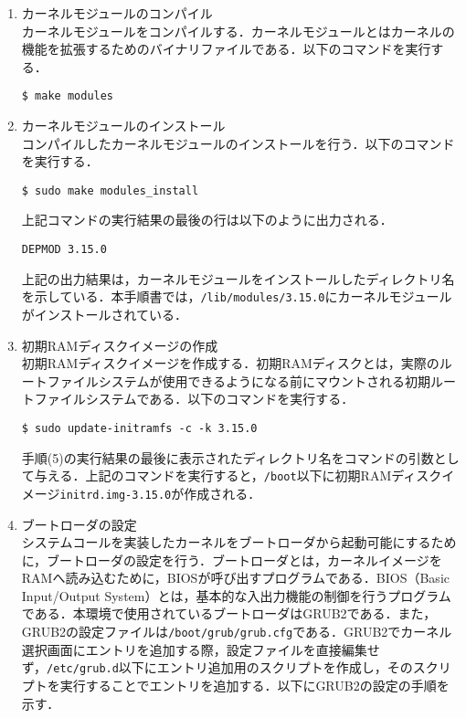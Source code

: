 \documentclass[12pt]{jsarticle}
\begin{document}
\begin{enumerate}
\item カーネルモジュールのコンパイル \\
  カーネルモジュールをコンパイルする．カーネルモジュールとはカーネルの機能を拡張するためのバイナリファイルである．以下のコマンドを実行する．

\begin{verbatim}
$ make modules
\end{verbatim}
  
\item カーネルモジュールのインストール \\
  コンパイルしたカーネルモジュールのインストールを行う．以下のコマンドを実行する．

\begin{verbatim}
$ sudo make modules_install
\end{verbatim}
上記コマンドの実行結果の最後の行は以下のように出力される．

\begin{verbatim}
DEPMOD 3.15.0
\end{verbatim}
上記の出力結果は，カーネルモジュールをインストールしたディレクトリ名を示している．本手順書では，\verb|/lib/modules/3.15.0|にカーネルモジュールがインストールされている．

\item 初期RAMディスクイメージの作成 \\
  初期RAMディスクイメージを作成する．初期RAMディスクとは，実際のルートファイルシステムが使用できるようになる前にマウントされる初期ルートファイルシステムである．以下のコマンドを実行する．

\begin{verbatim}
$ sudo update-initramfs -c -k 3.15.0
\end{verbatim}
手順(5)の実行結果の最後に表示されたディレクトリ名をコマンドの引数として与える．上記のコマンドを実行すると，\verb|/boot|以下に初期RAMディスクイメージ\verb|initrd.img-3.15.0|が作成される．

\item ブートローダの設定 \\
  システムコールを実装したカーネルをブートローダから起動可能にするために，ブートローダの設定を行う．ブートローダとは，カーネルイメージをRAMへ読み込むために，BIOSが呼び出すプログラムである．BIOS（Basic Input/Output System）とは，基本的な入出力機能の制御を行うプログラムである\cite{daniel2007}．本環境で使用されているブートローダはGRUB2である．また，GRUB2の設定ファイルは\verb|/boot/grub/grub.cfg|である．GRUB2でカーネル選択画面にエントリを追加する際，設定ファイルを直接編集せず，\verb|/etc/grub.d|以下にエントリ追加用のスクリプトを作成し，そのスクリプトを実行することでエントリを追加する．以下にGRUB2の設定の手順を示す．
  

\end{enumerate}
\end{document}
